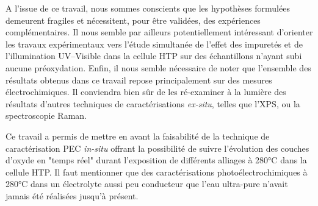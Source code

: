 \begin{refsection}
A l’issue de ce travail, nous sommes conscients que les hypothèses formulées demeurent fragiles et nécessitent, pour être
validées, des expériences complémentaires. 
Il nous semble par ailleurs potentiellement intéressant d’orienter les travaux
expérimentaux vers l’étude simultanée de l’effet des impuretés et de l’illumination UV--Visible dans la cellule HTP sur
des échantillons n’ayant subi aucune préoxydation. Enfin, il nous semble nécessaire de noter que l’ensemble des
résultats obtenus dans ce travail repose principalement sur des mesures électrochimiques. Il conviendra bien sûr de les
ré-examiner à la lumière des résultats d’autres techniques de caractérisations \emph{ex-situ}, telles que l’XPS, ou la
spectroscopie Raman.

Ce travail a permis de mettre en avant la faisabilité de la technique de caractérisation PEC \emph{in-situ} offrant la
possibilité de suivre l’évolution des couches d’oxyde en "temps réel" durant l’exposition de différents alliages à
280°C dans la cellule HTP. Il faut mentionner que des caractérisations photoélectrochimiques à 280°C dans un électrolyte
aussi peu conducteur que l’eau ultra-pure n’avait jamais été réalisées jusqu’à présent.


\printbibliography[heading=subbibintoc]
\end{refsection}
